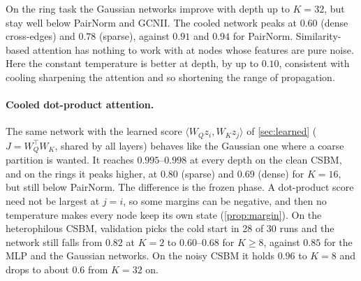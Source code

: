 \documentclass[10pt]{article}
\theoremstyle{definition}
\theoremstyle{remark}
\begin{document}
On the ring task the Gaussian networks improve with depth up to $K=32$, but stay well below PairNorm and GCNII. The cooled network peaks
at $0.60$ (dense cross-edges) and $0.78$ (sparse), against $0.91$ and $0.94$ for PairNorm. Similarity-based attention has nothing to work
with at nodes whose features are pure noise. Here the constant temperature is better at depth, by up to $0.10$, consistent with cooling
sharpening the attention and so shortening the range of propagation.

\paragraph{Cooled dot-product attention.} The same network with the learned score $\langle W_Qz_i,W_Kz_j\rangle$ of \cref{sec:learned}
($J=W_Q^\top W_K$, shared by all layers) behaves like the Gaussian one where a coarse partition is wanted. It reaches $0.995$--$0.998$ at every depth on
the clean CSBM, and on the rings it peaks higher, at $0.80$ (sparse) and $0.69$ (dense) for $K=16$, but still below PairNorm. The difference is the
frozen phase. A dot-product score need not be largest at $j=i$, so some margins can be negative, and then no temperature makes every node
keep its own state (\cref{prop:margin}). On the heterophilous CSBM, validation picks the cold start in 28 of 30 runs and the
network still falls from $0.82$ at $K=2$ to $0.60$--$0.68$ for $K\ge8$, against $0.85$ for the MLP and the Gaussian networks. On the noisy
CSBM it holds $0.96$ to $K=8$ and drops to about $0.6$ from $K=32$ on.
\end{document}

